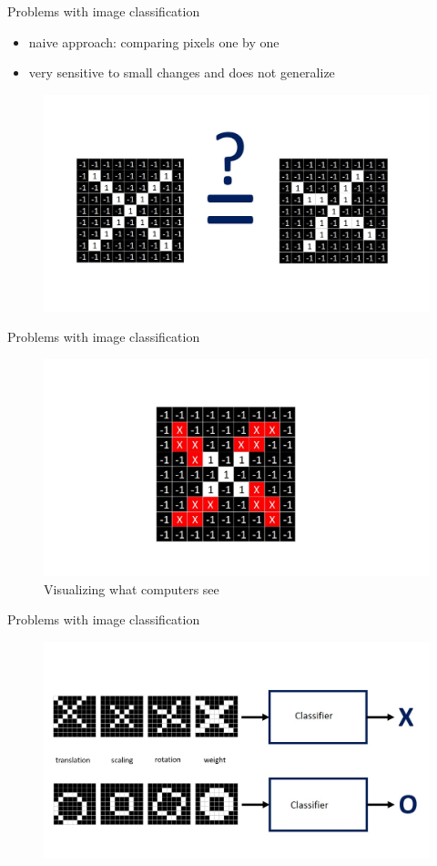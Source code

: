 \documentclass[12pt]{beamer}
\begin{document}
\begin{frame}{Problems with image classification}
  \begin{itemize}
     \item naive approach: comparing pixels one by one
     \item very sensitive to small changes and does not generalize	
  \end{itemize}
\begin{figure}
\includegraphics[width = 0.4\linewidth]{images/equal.jpg}
\label{fig:principle}
\end{figure}
\end{frame}
\begin{frame}{Problems with image classification}
\begin{figure}
\includegraphics[width = 0.8\linewidth]{images/neq.jpg}
\caption{Visualizing what computers see}
\label{fig:principle}
\end{figure}
\end{frame}
\begin{frame}{Problems with image classification}
\begin{figure}
\includegraphics[width = 0.8\linewidth]{images/diff.jpg}
\label{fig:principle}
\end{figure}
\end{frame}
\end{document}
